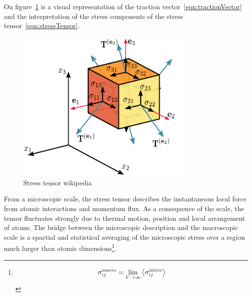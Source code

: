On figure~\ref{fig:stressTensor} is a visual representation of the traction vector~\eqref{eqn:tractionVector} and the interpretation of the stress components of the stress tensor~\eqref{eqn:stressTensor}. 
\begin{figure}[ht!]
    \centering
    \includegraphics[width=0.8\textwidth]{figs/Components_stress_tensor_cartesian.pdf}
    \caption{Stress tensor wikipedia}\label{fig:stressTensor}
\end{figure}


From a microscopic scale, the stress tensor describes the instantaneous local force from atomic interactions and momentum flux.
As a consequence of the scale, the tensor fluctuates strongly due to thermal motion, position and local arrangement of atoms.
The bridge between the microscopic description and the macroscopic scale is a spactial and statistical averaging of the microscopic stress over a region much larger than atomic dimensions\footnote{\[\sigma_{ij}^{\mathrm{macro}}=\lim_{V\to\infty}\expval{\sigma_{ij}^{\mathrm{micro}}}\]}.


